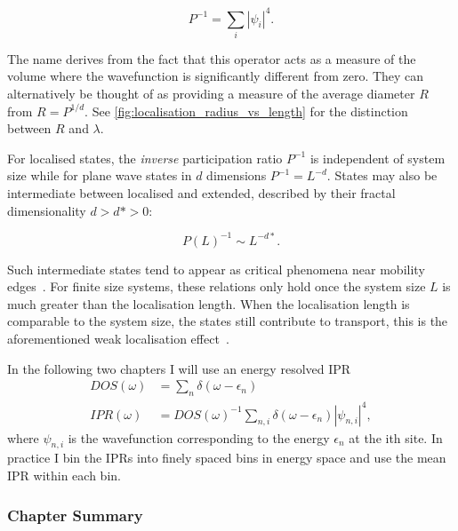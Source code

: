 \[
P^{-1} = \sum_i |\psi_i|^4.
\]

The name derives from the fact that this operator acts as a measure of the volume where the wavefunction is significantly different from zero. They can alternatively be thought of as providing a measure of the average diameter \(R\) from \(R = P^{1/d}\). See \cref{fig:localisation_radius_vs_length} for the distinction between \(R\) and \(\lambda\).

For localised states, the \emph{inverse} participation ratio \(P^{-1}\) is independent of system size while for plane wave states in \(d\) dimensions \(P^{-1} = L^{-d}\). States may also be intermediate between localised and extended, described by their fractal dimensionality \(d > d* > 0\):

\[
P(L)^{-1} \sim L^{-d*}.
\]

Such intermediate states tend to appear as critical phenomena near mobility edges~\autocite{eversAndersonTransitions2008}. For finite size systems, these relations only hold once the system size \(L\) is much greater than the localisation length. When the localisation length is comparable to the system size, the states still contribute to transport, this is the aforementioned weak localisation effect~\autocite{altshulerMagnetoresistanceHallEffect1980,dattaElectronicTransportMesoscopic1995}.

In the following two chapters I will use an energy resolved IPR \[
\begin{aligned}
DOS(\omega) &= \sum_n \delta(\omega - \epsilon_n)\\
IPR(\omega) &= DOS(\omega)^{-1} \sum_{n,i} \delta(\omega - \epsilon_n) |\psi_{n,i}|^4,
\end{aligned}
\] where \(\psi_{n,i}\) is the wavefunction corresponding to the energy \(\epsilon_n\) at the ith site. In practice I bin the IPRs into finely spaced bins in energy space and use the mean IPR within each bin.

\hypertarget{chapter-summary}{%
\subsubsection{Chapter Summary}\label{chapter-summary}}


